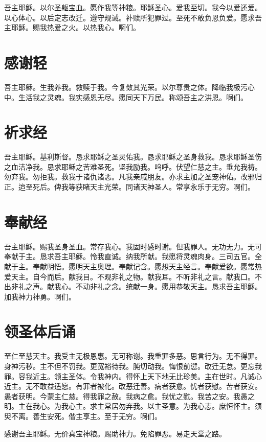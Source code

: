 \documentclass[UTF8,17pt]{ctexart}
\begin{document}
吾主耶稣。以尔圣躯宝⾎。愿作我等神粮。耶稣圣⼼。爱我⾄切。我今以爱还爱。以⼼体⼼。以后定志改迁。遵守规诫。补赎所犯罪过。⾄死不敢负恩负爱。愿求吾主耶稣。赐我热爱之⽕。以热我⼼。啊们。

\section{感谢轻}

吾主耶稣。⽣我养我。救赎于我。今复敛其光荣。以尔尊贵之体。降临我极污⼼中。⽣活我之灵魂。我实感恩⽆尽。愿同天下万民。称颂吾主之洪恩。啊们。

\section{祈求经}

吾主耶稣。基利斯督。恳求耶稣之圣灵佑我。恳求耶稣之圣⾝救我。恳求耶稣圣伤之⾎洁净我。恳求耶稣之苦难圣死。坚我励我。呜呼。伏望仁慈之主。垂允我祷。勿弃我。勿拒我。救我于诸仇诸恶。凡我亲戚朋友。亦求主加之圣宠神佑。改邪归正。迨⾄死后。俾我等获睹天主光荣。同诸天神圣⼈。常享永乐于⽆穷。啊们。

\section{奉献经}

吾主耶稣。赐我圣⾝圣⾎。常存我⼼。我固时感时谢。但我罪⼈。⽆功⽆⼒。⽆可奉献于主。恳求吾主耶稣。怜我直诚。纳我所献。我愿将灵魂⾁⾝。三司五官。全献于主。奉献明悟。愿明天主奥理。奉献记含。愿想天主经⾔。奉献爱欲。愿常热爱天主。⾃今⽽后。献我⽬。不观⾮礼之物。献我⽿。不听⾮礼之⾔。献我口。不出⾮礼之声。献我⼼。不动⾮礼之念。统献⼀⾝。愿⽤恭敬天主。恳求吾主耶稣。加我神⼒神勇。啊们。

\section{领圣体后诵}

⾄仁⾄慈天主。我受主⽆极恩惠。⽆可称谢。我重罪多恶。思⾔⾏为。⽆不得罪。⾝神污秽。主不但不罚我。更宽裕待我。肫切动我。悔恨前愆。改迁⽆怠。更忘我罪。容我近主。领主圣体。令我神内。得怀上天下地⽆⽐珍美。主在世时。凡诚⼼近主。⽆不敢益适愿。有罪者被化。改恶迁善。病者获愈。忧者获慰。苦者获安。愚者获明。今蒙主仁慈。得我罪之赦。我病之愈。我忧之慰。我苦之安。我愚之明。主在我⼼。为我⼼主。求主常居勿弃我。以主圣意。为我⼼志。庶恒怀主。须臾不离。善⽣安死。偕主享主。⾄于⽆穷。啊们。

感谢吾主耶稣。⽆价真宝神粮。赐助神力。免陷罪恶。易⾛天堂之路。
\end{document}
